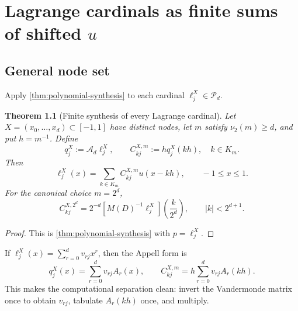 \documentclass[11pt,oneside]{book}
\newtheorem{theorem}{Theorem}[chapter]
\theoremstyle{definition}
\theoremstyle{remark}
\newcommand{\Pp}{\mathcal P}
\newcommand{\Aop}{\mathcal A}
\newcommand{\vtwo}{\nu_2}
\begin{document}
\chapter{Lagrange cardinals as finite sums of shifted \texorpdfstring{$u$}{up}}
\label{ch:lagrange-synthesis}

\section{General node set}
Apply \cref{thm:polynomial-synthesis} to each cardinal \(\ell_j^X\in\Pp_d\).

\begin{theorem}[Finite synthesis of every Lagrange cardinal]
\label{thm:lagrange-synthesis}
Let \(X=(x_0,\ldots,x_d)\subset[-1,1]\) have distinct nodes, let \(m\) satisfy \(\vtwo(m)\ge d\), and put \(h=m^{-1}\).  Define
\begin{equation}
 q_j^X:=\Aop_d\ell_j^X,
 \qquad
 C_{kj}^{X,m}:=h q_j^X(kh),
 \quad k\in K_m.
 \label{eq:C-coefficients}
\end{equation}
Then
\begin{equation}
 \boxed{
 \ell_j^X(x)=\sum_{k\in K_m}C_{kj}^{X,m}u(x-kh),
 \qquad -1\le x\le1.}
 \label{eq:lagrange-synthesis-boxed}
\end{equation}
For the canonical choice \(m=2^d\),
\begin{equation}
 C_{kj}^{X,2^d}
 =2^{-d}\left[M(D)^{-1}\ell_j^X\right]\!\left(\frac{k}{2^d}\right),
 \qquad |k|<2^{d+1}.
 \label{eq:canonical-cardinal-coefficients}
\end{equation}
\end{theorem}

\begin{proof}
This is \cref{thm:polynomial-synthesis} with \(p=\ell_j^X\).
\end{proof}

If \(\ell_j^X(x)=\sum_{r=0}^{d}v_{rj}x^r\), then the Appell form is
\begin{equation}
 q_j^X(x)=\sum_{r=0}^{d}v_{rj}A_r(x),
 \qquad
 C_{kj}^{X,m}=h\sum_{r=0}^{d}v_{rj}A_r(kh).
 \label{eq:C-appell}
\end{equation}
This makes the computational separation clean: invert the Vandermonde matrix once to obtain \(v_{rj}\), tabulate \(A_r(kh)\) once, and multiply.
\end{document}
